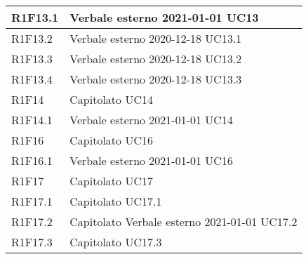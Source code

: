 \begin{center}
\begin{longtable}{|p{22mm}|p{22mm}|}
R1F13.1 &
Verbale esterno 2021-01-01 \newline
UC13 \newline
\\
\hline

R1F13.2 &
Verbale esterno 2020-12-18 \newline
UC13.1 \newline
\\
\hline

R1F13.3 &
Verbale esterno 2020-12-18 \newline
UC13.2 \newline
\\
\hline

R1F13.4 &
Verbale esterno 2020-12-18 \newline
UC13.3 \newline
\\
\hline

R1F14 &
Capitolato \newline
UC14 \newline
\\
\hline

R1F14.1 &
Verbale esterno 2021-01-01 \newline
UC14 \newline
\\
\hline

R1F16 &
Capitolato \newline
UC16 \newline
\\
\hline

R1F16.1 &
Verbale esterno 2021-01-01 \newline
UC16 \newline
\\
\hline

R1F17 &
Capitolato \newline
UC17 \newline
\\
\hline

R1F17.1 &
Capitolato \newline
UC17.1 \newline
\\
\hline

R1F17.2 &
Capitolato \newline
Verbale esterno 2021-01-01 \newline
UC17.2 \newline
\\
\hline

R1F17.3 &
Capitolato \newline
UC17.3 \newline
\\
\hline


\end{longtable}
\end{center}
